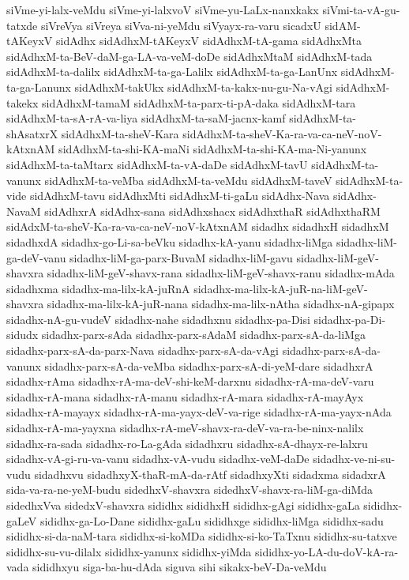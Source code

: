 {siVme-yi-lalx-veMdu
siVme-yi-lalxvoV
siVme-yu-LaLx-nanxkakx
siVmi-ta-vA-gu-tatxde
siVreVya
siVreya
siVva-ni-yeMdu
siVyayx-ra-varu
sicadxU
sidAM-tAKeyxV
sidAdhx
sidAdhxM-tAKeyxV
sidAdhxM-tA-gama
sidAdhxMta
sidAdhxM-ta-BeV-daM-ga-LA-va-veM-doDe
sidAdhxMtaM
sidAdhxM-tada
sidAdhxM-ta-dalilx
sidAdhxM-ta-ga-Lalilx
sidAdhxM-ta-ga-LanUnx
sidAdhxM-ta-ga-Lanunx
sidAdhxM-takUkx
sidAdhxM-ta-kakx-nu-gu-Na-vAgi
sidAdhxM-takekx
sidAdhxM-tamaM
sidAdhxM-ta-parx-ti-pA-daka
sidAdhxM-tara
sidAdhxM-ta-sA-rA-va-liya
sidAdhxM-ta-saM-jacnx-kamf
sidAdhxM-ta-shAsatxrX
sidAdhxM-ta-sheV-Kara
sidAdhxM-ta-sheV-Ka-ra-va-ca-neV-noV-kAtxnAM
sidAdhxM-ta-shi-KA-maNi
sidAdhxM-ta-shi-KA-ma-Ni-yanunx
sidAdhxM-ta-taMtarx
sidAdhxM-ta-vA-daDe
sidAdhxM-tavU
sidAdhxM-ta-vanunx
sidAdhxM-ta-veMba
sidAdhxM-ta-veMdu
sidAdhxM-taveV
sidAdhxM-ta-vide
sidAdhxM-tavu
sidAdhxMti
sidAdhxM-ti-gaLu
sidAdhx-Nava
sidAdhx-NavaM
sidAdhxrA
sidAdhx-sana
sidAdhxshacx
sidAdhxthaR
sidAdhxthaRM
sidAdxM-ta-sheV-Ka-ra-va-ca-neV-noV-kAtxnAM
sidadhx
sidadhxH
sidadhxM
sidadhxdA
sidadhx-go-Li-sa-beVku
sidadhx-kA-yanu
sidadhx-liMga
sidadhx-liM-ga-deV-vanu
sidadhx-liM-ga-parx-BuvaM
sidadhx-liM-gavu
sidadhx-liM-geV-shavxra
sidadhx-liM-geV-shavx-rana
sidadhx-liM-geV-shavx-ranu
sidadhx-mAda
sidadhxma
sidadhx-ma-lilx-kA-juRnA
sidadhx-ma-lilx-kA-juR-na-liM-geV-shavxra
sidadhx-ma-lilx-kA-juR-nana
sidadhx-ma-lilx-nAtha
sidadhx-nA-gipapx
sidadhx-nA-gu-vudeV
sidadhx-nahe
sidadhxnu
sidadhx-pa-Disi
sidadhx-pa-Di-sidudx
sidadhx-parx-sAda
sidadhx-parx-sAdaM
sidadhx-parx-sA-da-liMga
sidadhx-parx-sA-da-parx-Nava
sidadhx-parx-sA-da-vAgi
sidadhx-parx-sA-da-vanunx
sidadhx-parx-sA-da-veMba
sidadhx-parx-sA-di-yeM-dare
sidadhxrA
sidadhx-rAma
sidadhx-rA-ma-deV-shi-keM-darxnu
sidadhx-rA-ma-deV-varu
sidadhx-rA-mana
sidadhx-rA-manu
sidadhx-rA-mara
sidadhx-rA-mayAyx
sidadhx-rA-mayayx
sidadhx-rA-ma-yayx-deV-va-rige
sidadhx-rA-ma-yayx-nAda
sidadhx-rA-ma-yayxna
sidadhx-rA-meV-shavx-ra-deV-va-ra-be-ninx-nalilx
sidadhx-ra-sada
sidadhx-ro-La-gAda
sidadhxru
sidadhx-sA-dhayx-re-lalxru
sidadhx-vA-gi-ru-va-vanu
sidadhx-vA-vudu
sidadhx-veM-daDe
sidadhx-ve-ni-su-vudu
sidadhxvu
sidadhxyX-thaR-mA-da-rAtf
sidadhxyXti
sidadxma
sidadxrA
sida-va-ra-ne-yeM-budu
sidedhxV-shavxra
sidedhxV-shavx-ra-liM-ga-diMda
sidedhxVva
sidedxV-shavxra
sididhx
sididhxH
sididhx-gAgi
sididhx-gaLa
sididhx-gaLeV
sididhx-ga-Lo-Dane
sididhx-gaLu
sididhxge
sididhx-liMga
sididhx-sadu
sididhx-si-da-naM-tara
sididhx-si-koMDa
sididhx-si-ko-TaTxnu
sididhx-su-tatxve
sididhx-su-vu-dilalx
sididhx-yanunx
sididhx-yiMda
sididhx-yo-LA-du-doV-kA-ra-vada
sididhxyu
siga-ba-hu-dAda
siguva
sihi
sikakx-beV-Da-veMdu
}
